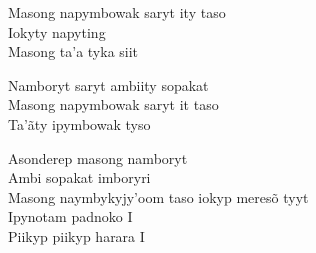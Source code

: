 \bigskip

\begin{linenumbers}\begingroup\raggedright
\noindent Masong napymbowak saryt ity taso\\
Iokyty napyting\\
Masong ta'a tyka siit
\end{linenumbers}\endgroup

\bigskip

\begin{linenumbers}\begingroup\raggedright
\noindent Namboryt saryt ambiity sopakat\\
Masong napymbowak saryt it taso\\
Ta'ãty ipymbowak tyso
\end{linenumbers}\endgroup

\bigskip

\begin{linenumbers}\begingroup\raggedright
\noindent Asonderep masong namboryt\\
Ambi sopakat imboryri\\
Masong naymbykyjy'oom taso iokyp meresõ tyyt\\
Ipynotam padnoko I\\
Piikyp piikyp harara I
\end{linenumbers}\endgroup

\bigskip

